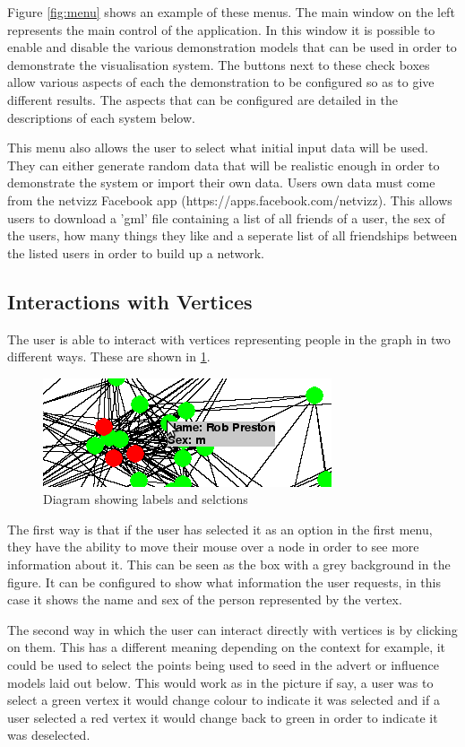\documentclass[12pt,a4paper]{article}
\begin{document}
Figure \ref{fig:menu} shows an example of these menus. The main window on the left represents the main control of the application. In this window it is possible to enable and disable the various demonstration models that can be used in order to demonstrate the visualisation system. The buttons next to these check boxes allow various aspects of each the demonstration to be configured so as to give different results. The aspects that can be configured are detailed in the descriptions of each system below.

This menu also allows the user to select what initial input data will be used. They can either generate random data that will be realistic enough in order to demonstrate the system or import their own data. Users own data must come from the netvizz Facebook app (https://apps.facebook.com/netvizz). This allows users to download a 'gml' file containing a list of all friends of a user, the sex of the users, how many things they like and a seperate list of all friendships between the listed users in order to build up a network.

\subsection{Interactions with Vertices}

The user is able to interact with vertices representing people in the graph in two different ways. These are shown in \ref{fig:labels}.

\begin{figure}[htb]
\centering
\caption{Diagram showing labels and selctions}
\label{fig:labels}
\includegraphics[scale=1]{Select.png}
\end{figure}

The first way is that if the user has selected it as an option in the first menu, they have the ability to move their mouse over a node in order to see more information about it. This can be seen as the box with a grey background in the figure. It can be configured to show what information the user requests, in this case it shows the name and sex of the person represented by the vertex.

The second way in which the user can interact directly with vertices is by clicking on them. This has a different meaning depending on the context for example, it could be used to select the points being used to seed in the advert or influence models laid out below. This would work as in the picture if say, a user was to select a green vertex it would change colour to indicate it was selected and if a user selected a red vertex it would change back to green in order to indicate it was deselected.
\end{document}
